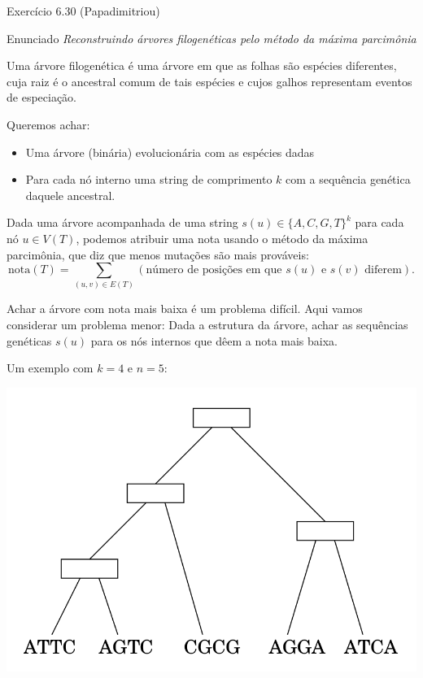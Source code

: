 \documentclass[presentation]{beamer}
\begin{document}
\begin{frame}[fragile,label=sec-4]{Exercício 6.30 (Papadimitriou)}

 \begin{block}{Enunciado}
\textit{Reconstruindo árvores filogenéticas pelo método da máxima parcimônia}

Uma árvore filogenética é uma árvore em que as folhas são espécies
diferentes, cuja raiz é o ancestral comum de tais espécies e cujos
galhos representam eventos de especiação.

Queremos achar:

\begin{itemize}
\item Uma árvore (binária) evolucionária com as espécies dadas
\item Para cada nó interno uma string de comprimento $k$ com a
sequência genética daquele ancestral.
\end{itemize}


Dada uma árvore acompanhada de uma string $s(u) \in \{A, C, G, T\}^k$ para
cada nó $u \in V(T)$, podemos atribuir uma nota usando o método da
máxima parcimônia, que diz que menos mutações são mais prováveis:
\[ \mathrm{nota}(T) = \sum_{(u,v) \in E(T)} (\text{número de posições em que }s(u)\text{ e }s(v)\text{ diferem}). \]

Achar a árvore com nota mais baixa é um problema difícil. Aqui vamos
considerar um problema menor: Dada a estrutura da árvore, achar as
sequências genéticas $s(u)$ para os nós internos que dêem a nota mais
baixa.

Um exemplo com $k = 4$ e $n = 5$:

\href{http://github.com/adusca/FGV-EDA/6_30/tree.png}{\includegraphics[width=.9\linewidth]{tree.png}}


\end{block}
\end{frame}
\end{document}
